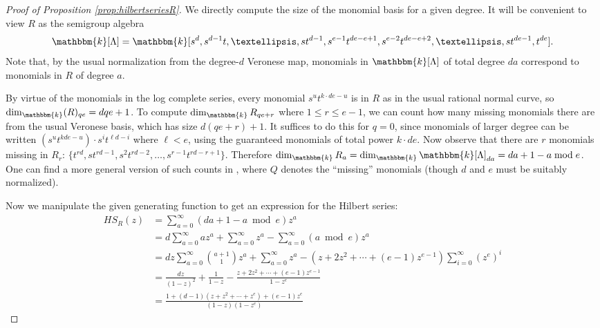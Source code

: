 \documentclass[12pt,reqno]{amsart}
\theoremstyle{definition}
\theoremstyle{remark}
\newcommand{\bbk}{\mathbbm{k}}
\begin{document}
\begin{proof}[Proof of Proposition \ref{prop:hilbertseriesR}]

We directly compute the size of the monomial basis for a given degree. It will be convenient to view $R$ as the semigroup algebra
\[
\bbk[\Lambda] = \bbk[s^d, s^{d-1}t, \ldots, st^{d-1}, s^{e-1}t^{de-e+1}, s^{e-2}t^{de-e+2}, \ldots, st^{de-1}, t^{de}].
\]
Note that, by the usual normalization from the degree-$d$ Veronese map, monomials in $\bbk[\Lambda]$ of total degree $da$ correspond to monomials in $R$ of degree $a$.

By virtue of the monomials in the log complete series, every monomial $s^u t^{k\cdot de - u}$ is in $R$ as in the usual rational normal curve, so $\dim_\bbk (R)_{qe} = dqe+1$. To compute $\dim_\bbk R_{qe+r}$ where $1 \leq r \leq e-1$, we can count how many missing monomials there are from the usual Veronese basis, which has size $d(qe+r)+1$. It suffices to do this for $q=0$, since monomials of larger degree can be written $(s^u t^{kde-u}) \cdot s^i t^{\ell d-i}$ where $\ell < e$, using the guaranteed monomials of total power $k \cdot de$. Now observe that there are $r$ monomials missing in $R_r$: $\{t^{rd}, st^{rd-1}, s^2t^{rd-2}, \ldots, s^{r-1}t^{rd-r+1}\}$. Therefore $\dim_\bbk R_a = \dim_\bbk \bbk[\Lambda]_{da} = da + 1 - a \bmod e$. One can find a more general version of such counts in \cite[Proposition~6.3]{beLinSyzOCurvesIWProjSp}, where $Q$ denotes the ``missing'' monomials (though $d$ and $e$ must be suitably normalized). 

Now we manipulate the given generating function to get an expression for the Hilbert series: 
\[
\begin{aligned}
HS_{R}(z) &= \sum\limits_{a=0}^\infty (da+1 - a \bmod e) z^a \\
&= d\sum\limits_{a=0}^\infty az^a + \sum\limits_{a=0}^\infty z^a - \sum\limits_{a=0}^\infty (a \bmod e) z^a \\
&= dz \sum\limits_{a=0}^\infty \binom{a+1}{1}z^a + \sum\limits_{a=0}^\infty z^a - (z + 2z^2 + \cdots + (e-1)z^{e-1}) \sum\limits_{i=0}^\infty (z^e)^i \\ 
&= \frac{dz}{(1-z)^2} + \frac{1}{1-z} - \frac{z + 2z^2 + \cdots + (e-1)z^{e-1}}{1-z^e} \\ 
&= \frac{1 + (d-1)(z+z^2 + \cdots + z^e)+(e-1)z^e}{(1-z)(1-z^e)}
\end{aligned}
\]
\end{proof}
\end{document}
